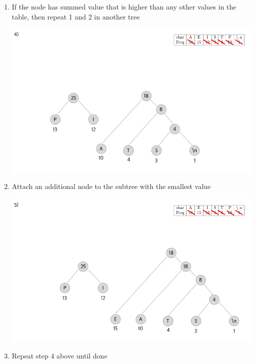 \documentclass[12pt]{article}
\begin{document}
\begin{enumerate}[1.]
\begin{itemize}
\begin{enumerate}[1.]
            \item If the node has summed value that is higher than any other values in the table,
            then repeat 1 and 2 in another tree

            \begin{center}
            \includegraphics[width=\linewidth]{images/worksheet_2_solution_16.png}
            \end{center}

            \item Attach an additional node to the subtree with the smallest value


            \begin{center}
            \includegraphics[width=\linewidth]{images/worksheet_2_solution_17.png}
            \end{center}

            \item Repeat step 4 above until done


\end{enumerate}
\end{itemize}
\end{enumerate}
\end{document}
